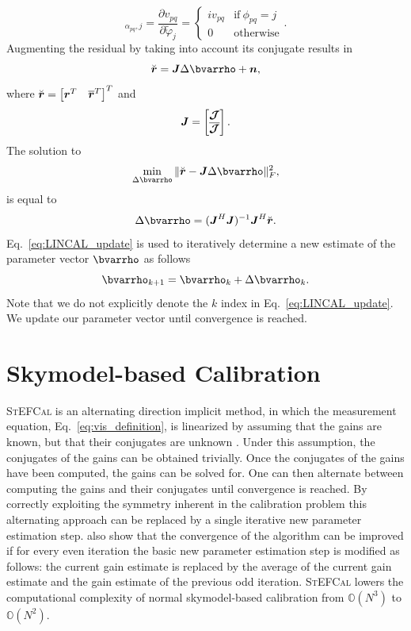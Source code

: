 \documentclass[useAMS,usenatbib]{mn2e}
\newcommand{\br}{\bmath{r}}
\newcommand{\bn}{\bmath{n}}
\newcommand{\bJ}{\bmath{J}}
\newcommand{\bR}{\bmath{R}}
\newcommand{\bmJ}{\bmath{\mathcal{J}}}
\newcommand{\conj}[1]{\overline{#1}}
\begin{document}
\begin{equation}
 [\bR]_{\alpha_{pq},j} =  \frac{\partial v_{pq}}{\partial \widetilde{\varphi}_j} = \begin{cases} 
    i v_{pq} &\textrm{if}~\phi_{pq}=j\\
    0 & \textrm{otherwise}
   \end{cases}.
\end{equation}
Augmenting the residual by taking into account its conjugate results in 
\begin{equation}
\breve{\br} = \bJ \Delta \bvarrho + \bn, 
\end{equation}
where $\breve{\br} = \begin{bmatrix}\br^T & \conj{\br}^T \end{bmatrix}^T$ and 
\begin{equation}
\label{eq:Jac_lin}
\bJ = 
\begin{bmatrix}
 \bmJ\\  
 \conj{\bmJ}
\end{bmatrix}.
\end{equation}
The solution to 
\begin{equation}
 \min_{\Delta \bvarrho} \| \breve{\br} - \bJ \Delta \bvarrho\|_F^2,
\end{equation}
is equal to 
\begin{equation}
\label{eq:LINCAL_update}
\Delta \bvarrho = (\bJ^H\bJ)^{-1} \bJ^H\breve{\br}. 
\end{equation}
Eq.~\eqref{eq:LINCAL_update} is used to iteratively determine a new estimate of the parameter vector $\bvarrho$ as follows
\begin{equation}
\label{eq:new_rho}
\bvarrho_{k+1} = \bvarrho_k + \Delta \bvarrho_k. 
\end{equation}
Note that we do not explicitly denote the $k$ index in Eq.~\eqref{eq:LINCAL_update}. We update our parameter vector until convergence is reached.   

\section{Skymodel-based Calibration}
\label{sec:sbc}
\textsc{StEFCal} is an alternating direction implicit method, in which the measurement equation, Eq.~\eqref{eq:vis_definition}, is linearized by assuming that the gains are known, but
that their conjugates are unknown \citep{Mitchell:MWA-cal,Salvini2014}. Under this assumption, the conjugates of the gains can be obtained trivially. Once the conjugates of the gains have been computed, the gains can be solved for. One can then alternate between computing the gains and their conjugates until convergence
is reached. By correctly exploiting the symmetry inherent in the calibration problem this alternating approach can be replaced by a single iterative new parameter estimation step. \cite{Salvini2014} also show that
the convergence of the algorithm can be improved if for every even iteration the basic new parameter estimation step is modified as follows: the current gain estimate is replaced by the average of the current gain estimate and the gain estimate of the previous odd iteration.
\textsc{StEFCal} lowers the computational complexity of normal skymodel-based calibration from $\mathbb{O}(N^3)$ to $\mathbb{O}(N^2)$. 
\end{document}
